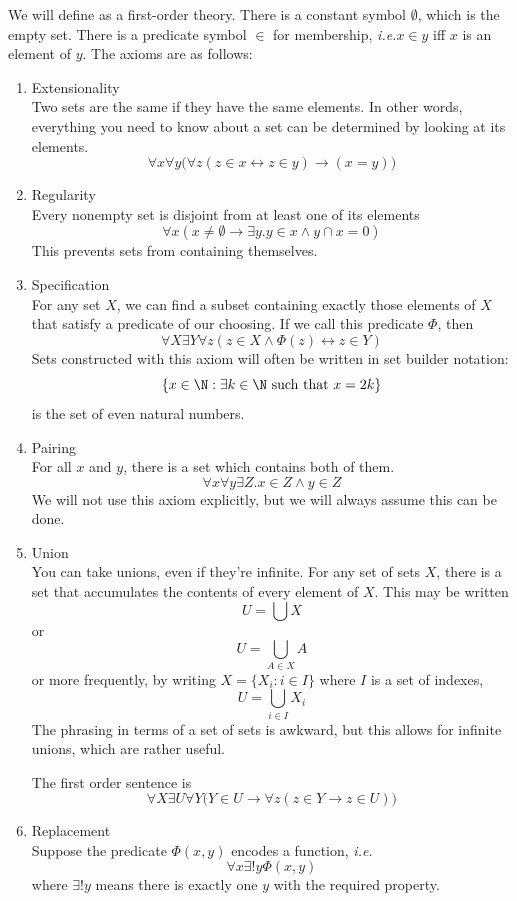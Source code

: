 \documentclass{scrbook}
\renewcommand{\implies}{\to}
\renewcommand{\iff}{\leftrightarrow}
\newcommand{\ie}{\emph{i.e.}\xspace}
\begin{document}
We will define \zfc as a first-order theory. There is a constant symbol $\emptyset$, which is the empty set. There is a predicate symbol $\in$ for membership, \ie $x\in y$ iff $x$ is an element of $y$. The axioms are as follows:
\begin{enumerate}
\item Extensionality \\
  Two sets are the same if they have the same elements. In other words, everything you need to know about a set can be determined by looking at its elements.
  \[
  \forall x \forall y  \bigl(\forall z(z\in x \iff z \in y)\implies (x=y)\bigr)
  \]
  \label{extensionality}
\item Regularity \\  
  Every nonempty set is disjoint from at least one of its elements
  \[
  \forall x (x\neq \emptyset \implies \exists y . y\in x \wedge y\cap x = 0)
  \]
  This prevents sets from containing themselves. \label{zfc:reg} 
\item Specification\label{zfc:spec} \\ 
  For any set $X$, we can find a subset containing exactly those elements of $X$ that satisfy a predicate of our choosing. If we call this predicate $\Phi$, then
  \[
  \forall X \exists Y \forall z  (z\in X \wedge \Phi(z) \iff z\in Y)
  \]
  Sets constructed with this axiom will often be written in set builder notation:
  \[
  \{x\in \N: \exists k \in \N \textrm{ such that } x=2k\}
  \]
  is the set of even natural numbers.
\item Pairing \\ 
  For all $x$ and $y$, there is a set which contains both of them. 
  \[
  \forall x \forall y \exists Z .x\in Z \wedge y \in Z
  \]
  We will not use this axiom explicitly, but we will always assume this can be done. 
\item Union \\
  You can take unions, even if they're infinite. 
  For any set of sets $X$, there is a set that accumulates the contents of every element of $X$. This may be written
  \[
  U=\bigcup X
  \]
  or
  \[
  U=\bigcup_{A\in X} A
  \]
  or more frequently, by writing $X=\{X_i:i\in I\}$ where $I$ is a set of indexes,
  \[
  U=\bigcup_{i\in I} X_i
  \]
  The phrasing in terms of a set of sets is awkward, but this allows for infinite unions, which are rather useful. 
  
  The first order sentence is
  \[
  \forall X \exists U \forall Y \bigl(Y\in U \implies \forall z ( z\in Y \implies z \in U)\bigr)
  \]
\item Replacement \\ 
  Suppose the predicate $\Phi(x,y)$ encodes a function, \ie 
  \[
  \forall x \exists! y \Phi(x,y)
  \]
  where $\exists!y$ means there is exactly one $y$ with the required property. 
  

\end{enumerate}
\end{document}
